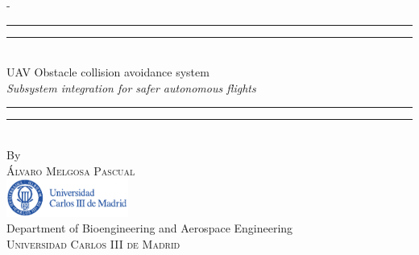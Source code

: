 %
%
% 
%
%
\begin{titlingpage}
\begin{SingleSpace}
\calccentering{\unitlength} 
\begin{adjustwidth*}{\unitlength}{-\unitlength}
\vspace*{13mm}
\begin{center}
\rule[0.5ex]{\linewidth}{2pt}\vspace*{-\baselineskip}\vspace*{3.2pt}
\rule[0.5ex]{\linewidth}{1pt}\\[\baselineskip]
{\HUGE UAV Obstacle collision avoidance system }\\[4mm]
{\Large \textit{ Subsystem integration for safer autonomous flights }}\\
\rule[0.5ex]{\linewidth}{1pt}\vspace*{-\baselineskip}\vspace{3.2pt}
\rule[0.5ex]{\linewidth}{2pt}\\
\vspace{1cm}
{\large By}\\
\vspace{0.5cm}
{\large\textsc{\'Alvaro Melgosa Pascual}}\\
\vspace{2cm}
\includegraphics[trim={0 0 2.13cm 0},clip, width=0.3\textwidth]{logos/logoUC3M.pdf}\\
\vspace{1cm}
{\large Department of Bioengineering and Aerospace Engineering\\
\textsc{Universidad Carlos III de Madrid}}\\

\end{center}
\end{adjustwidth*}
\end{SingleSpace}
\end{titlingpage}
